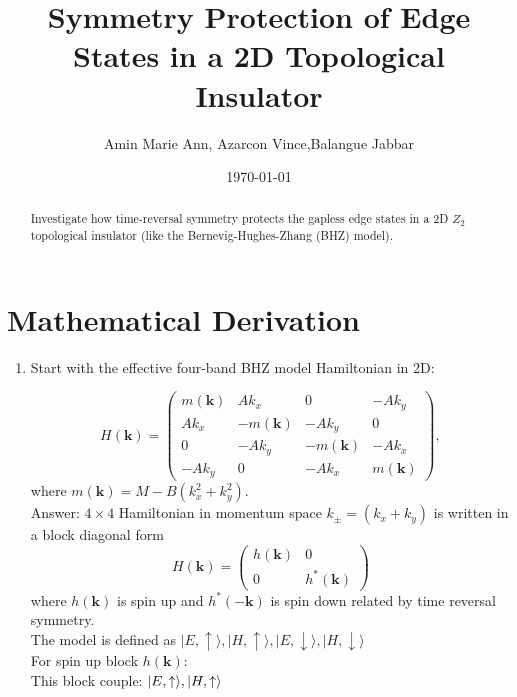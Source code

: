 \documentclass[a4paper,12pt]{article}
\title{Symmetry Protection of Edge States in a 2D Topological Insulator}
\author{Amin Marie Ann, Azarcon Vince,Balangue Jabbar}
\date{\today}
\begin{document}
\maketitle

\begin{abstract}
  Investigate how time-reversal symmetry protects the gapless edge states in a 2D $Z_2$ topological insulator (like the Bernevig-Hughes-Zhang (BHZ) model).
\end{abstract}

\section{Mathematical Derivation}
\begin{enumerate}
    \item Start with the effective four-band BHZ model Hamiltonian in 2D:
    
    \[
    H(\mathbf{k}) = \begin{pmatrix}
    m(\mathbf{k}) & A k_x & 0 & -A k_y \\
    A k_x & -m(\mathbf{k}) & -A k_y & 0 \\
    0 & -A k_y & -m(\mathbf{k}) & -A k_x \\
    -A k_y & 0 & -A k_x & m(\mathbf{k})
    \end{pmatrix},
    \]
    where $m(\mathbf{k}) = M - B(k_x^2 + k_y^2)$.\\
Answer: $4 \times4 $  Hamiltonian in momentum space $k_\pm = (k_x + k_y)$ is written in a block diagonal form\\
\[ H(\mathbf{k}) = \begin{pmatrix}
h(\mathbf{k}) & 0\\
0 & h^\ast(\mathbf{k})
\end{pmatrix}\]
where $h(\mathbf{k}) $ is spin up and $h^\ast(\mathbf{-k})$ is spin down related by time reversal  symmetry.\\
The model is defined as
$\vert E, \uparrow \rangle, \vert H, \uparrow \rangle, \vert E, \downarrow \rangle, \vert H, \downarrow \rangle$\\
For spin up block $h(\mathbf{k}):$\\
This block couple: $\vert E, \uparrow \rangle, \vert H, \uparrow \rangle\\$\\


\end{enumerate}
\end{document}
